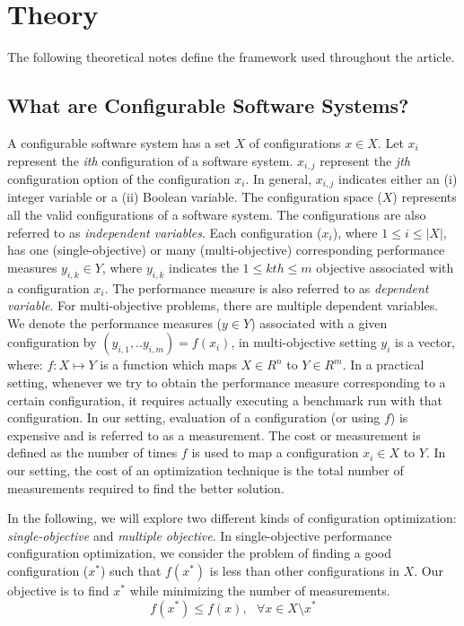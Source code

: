 \documentclass[10pt,journal,compsoc]{IEEEtran}
\begin{document}
\section{Theory}
The following theoretical notes define the framework used throughout the article.

\subsection{What are Configurable Software Systems?}\label{sec:problem_formal}

 
A configurable software system has a set $X$ of configurations $x \in X$. 
Let $x_i$ represent the \textit{ith} configuration of a software system. $x_{i,j}$ represent the \textit{jth} configuration option of the configuration $x_i$. In general, $x_{i,j}$ indicates either an (i) integer variable or a (ii) Boolean variable. The configuration space ($X$) represents all the valid configurations of a software system. The configurations are also referred to as \textit{independent variables}.
Each configuration ($x_i$), where $1\le i\le |X|$, has one (single-objective) or many (multi-objective) corresponding performance measures $y_{i,k} \in Y$, where $y_{i,k}$  indicates the $1\le kth\le m$ objective  associated with a configuration $x_i$. The performance measure is also referred to as \textit{dependent variable}. For multi-objective problems, there are multiple dependent variables. 
We denote the performance measures ($y\in Y$) associated with a given configuration by $(y_{i,1},..y_{i,m})=f(x_i)$, in multi-objective setting $y_i$ is a vector, where: $f: X\mapsto Y $ is a function which maps $X \in R^n$ to $Y \in R^m$. In a practical setting, whenever we try to obtain the performance measure corresponding to a certain configuration, it requires actually executing a benchmark run with that configuration. In our setting, evaluation of a configuration (or using $f$) is expensive and is referred to as a measurement. The cost or measurement is defined as the number of times $f$ is used to map a configuration $x_i \in X$ to $Y$. In our setting, the cost of an optimization technique is the total number of measurements required to find the better solution.

In the following, we will explore two different kinds of configuration optimization: {\em single-objective}
and {\em multiple objective}.
In single-objective performance configuration optimization,
we consider the problem of finding a good configuration ($x^*$) such that $f(x^*)$ is less than other configurations in $X$. Our objective is to find $x^*$ while minimizing the number of measurements.
\begin{equation}
    f(x^*) \le f(x),~~~ \forall x \in {X\setminus x^*}
\end{equation}
 
\end{document}
